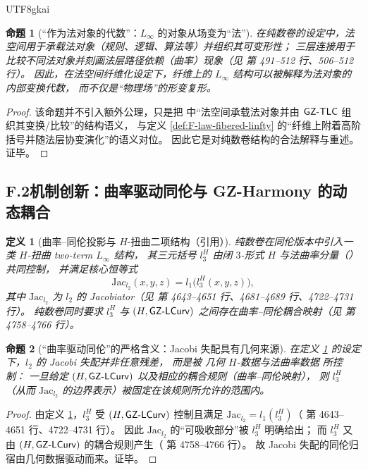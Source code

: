 \documentclass[12pt]{article}
\newtheorem{definition}{定义}[section]
\newtheorem{proposition}{命题}[section]
\begin{document}
\begin{CJK*}{UTF8}{gkai}
\begin{proposition}[“作为法对象的代数”：$L_\infty$ 的对象从场变为“法”]\label{prop:F-law-object-algebra}
在纯数卷的设定中，法空间用于承载法对象（规则、逻辑、算法等）并组织其可变形性；
三层连接用于比较不同法对象并刻画法层路径依赖（曲率）现象（见 \cite{GaoZheng2025GFramework} 第 491--512 行、506--512 行）。
因此，在法空间纤维化设定下，纤维上的 $L_\infty$ 结构可以被解释为\emph{法对象的内部变换代数}，
而不仅是“物理场”的形变复形。
\end{proposition}

\begin{proof}
该命题并不引入额外公理，只是把
\cite{GaoZheng2025GFramework} 中“法空间承载法对象并由 $\mathsf{GZ\text{-}TLC}$ 组织其变换/比较”的结构语义，
与定义 \ref{def:F-law-fibered-linfty} 的“纤维上附着高阶括号并随法层协变演化”的语义对位。
因此它是对纯数卷结构的合法解释与重述。证毕。
\end{proof}

\subsection{F.2\;机制创新：曲率驱动同伦与 GZ-Harmony 的动态耦合}

\begin{definition}[曲率--同伦投影与 $H$-扭曲二项结构（引用）]\label{def:F-curv-homotopy}
纯数卷在同伦版本中引入一类 $H$-扭曲 two-term $L_\infty$ 结构，
其三元括号 $l_3^H$ 由闭 $3$-形式 $H$ 与法曲率分量（\GZLCurv）共同控制，
并满足核心恒等式
\[
  \mathrm{Jac}_{l_2}(x,y,z)=l_1\bigl(l_3^H(x,y,z)\bigr),
\]
其中 $\mathrm{Jac}_{l_2}$ 为 $l_2$ 的 Jacobiator（见 \cite{GaoZheng2025GFramework} 第 4643--4651 行、4681--4689 行、4722--4731 行）。
纯数卷同时要求 $l_3^H$ 与 $(H,\mathsf{GZ\text{-}LCurv})$ 之间存在曲率--同伦耦合映射（见 \cite{GaoZheng2025GFramework} 第 4758--4766 行）。
\end{definition}

\begin{proposition}[“曲率驱动同伦”的严格含义：Jacobi 失配具有几何来源]\label{prop:F-geom-source}
在定义 \ref{def:F-curv-homotopy} 的设定下，$l_2$ 的 Jacobi 失配并非任意残差，
而是被 \emph{几何 $H$-数据与法曲率数据} 所控制：
一旦给定 $(H,\mathsf{GZ\text{-}LCurv})$ 以及相应的耦合规则（曲率--同伦映射），
则 $l_3^H$（从而 $\mathrm{Jac}_{l_2}$ 的边界表示）被固定在该规则所允许的范围内。
\end{proposition}

\begin{proof}
由定义 \ref{def:F-curv-homotopy}，$l_3^H$ 受 $(H,\mathsf{GZ\text{-}LCurv})$ 控制且满足
$\mathrm{Jac}_{l_2}=l_1(l_3^H)$（\cite{GaoZheng2025GFramework} 第 4643--4651 行、4722--4731 行）。
因此 $\mathrm{Jac}_{l_2}$ 的“可吸收部分”被 $l_3^H$ 明确给出；
而 $l_3^H$ 又由 $(H,\mathsf{GZ\text{-}LCurv})$ 的耦合规则产生（\cite{GaoZheng2025GFramework} 第 4758--4766 行）。
故 Jacobi 失配的同伦归宿由几何数据驱动而来。证毕。
\end{proof}


\end{CJK*}
\end{document}

